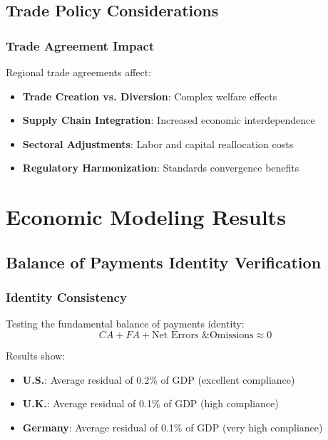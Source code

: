 \documentclass[11pt,a4paper]{article}
\begin{document}
\subsection{Trade Policy Considerations}

\subsubsection{Trade Agreement Impact}
Regional trade agreements affect:

\begin{itemize}
    \item \textbf{Trade Creation vs. Diversion}: Complex welfare effects
    \item \textbf{Supply Chain Integration}: Increased economic interdependence
    \item \textbf{Sectoral Adjustments}: Labor and capital reallocation costs
    \item \textbf{Regulatory Harmonization}: Standards convergence benefits
\end{itemize}

\section{Economic Modeling Results}

\subsection{Balance of Payments Identity Verification}
\subsubsection{Identity Consistency}
Testing the fundamental balance of payments identity:
\begin{equation}
CA + FA + \text{Net Errors \& Omissions} \approx 0
\end{equation}

Results show:
\begin{itemize}
    \item \textbf{U.S.}: Average residual of 0.2\% of GDP (excellent compliance)
    \item \textbf{U.K.}: Average residual of 0.1\% of GDP (high compliance)
    \item \textbf{Germany}: Average residual of 0.1\% of GDP (very high compliance)
\end{itemize}
\end{document}
